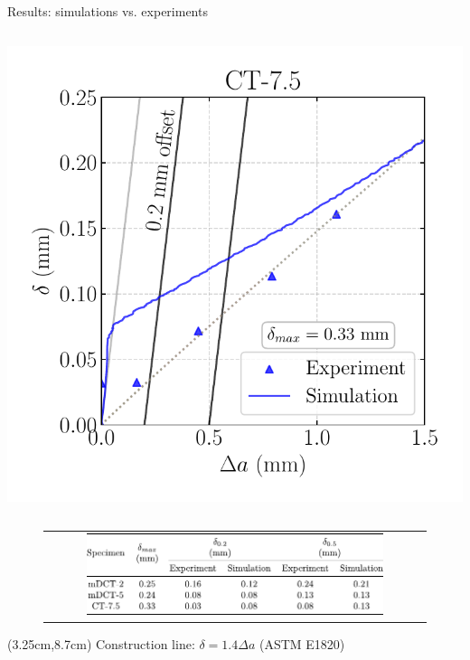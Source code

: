 \documentclass[9pt]{beamer}
\begin{document}
\begin{frame}{Results: simulations vs. experiments}
\begin{columns}
        \centering
        \includegraphics[width=1.0\textwidth]{Images/plot_CTOD-da_CT_X52.pdf}
    \end{columns}

    \begin{figure}
        \begin{tabular}{c}
            \includegraphics[width=0.8\textwidth]{Images/tab_CTOD-da.pdf} \\
        \end{tabular}
    \end{figure}

    \begin{textblock*}{7cm}(3.25cm,8.7cm)
        \small Construction line: $\delta = 1.4 \Delta a$ (ASTM E1820)
    \end{textblock*}

\end{frame}

\end{document}

